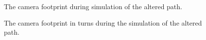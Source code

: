 \begin{figure}[!ht]
    \centering
    \caption{The camera footprint during simulation of the altered path.}
	\label{fig:second_camera_path}
\end{figure}

\begin{figure}[!ht]
    \centering
    \caption{The camera footprint in turns during the simulation of the altered path.}
	\label{fig:second_camera_turns}
\end{figure}

